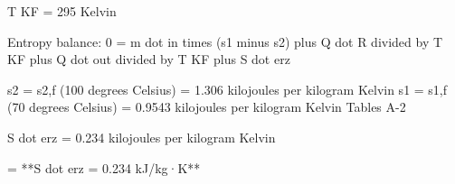 T KF = 295 Kelvin  

Entropy balance: 0 = m dot in times (s1 minus s2) plus Q dot R divided by T KF plus Q dot out divided by T KF plus S dot erz  

s2 = s2,f (100 degrees Celsius) = 1.306 kilojoules per kilogram Kelvin  
s1 = s1,f (70 degrees Celsius) = 0.9543 kilojoules per kilogram Kelvin  
Tables A-2  

S dot erz = 0.234 kilojoules per kilogram Kelvin  

= **S dot erz = 0.234 kJ/kg·K**